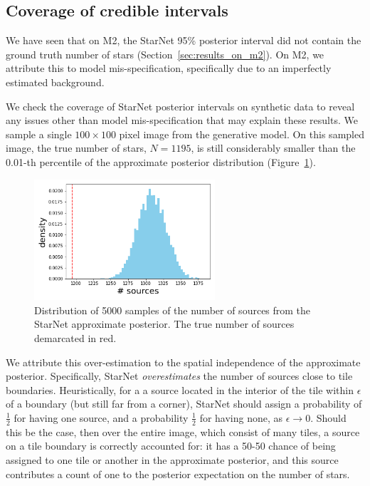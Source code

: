 \subsection{Coverage of credible intervals}

We have seen that on M2, the StarNet 95\% posterior interval did not contain the ground truth number of stars (Section~\ref{sec:results_on_m2}).
On M2, we attribute this to model mis-specification, specifically due to an imperfectly
estimated background.

We check the coverage of StarNet posterior intervals on synthetic data
to reveal any issues other than model mis-specification that may explain these results.
We sample a single $100\times100$ pixel image from the generative model. 
On this sampled image, the true number of stars, $N = 1195$,
is still considerably smaller than the 0.01-th percentile of
the approximate posterior distribution (Figure~\ref{fig:starnet_density}).


\begin{figure}[tb]
    \centering
    \includegraphics[width=0.6\textwidth]{./figures/coverage/starnet_histogram.png}
    \vspace{-0.4cm}
    \caption{Distribution of 5000 samples of the number of sources from the StarNet approximate posterior.
    The true number of sources demarcated in red. }
    \label{fig:starnet_density}
\end{figure}

We attribute this over-estimation to the spatial independence of the approximate posterior.
Specifically, StarNet \textit{overestimates} the number of sources close to tile boundaries.
Heuristically, for a
a source located in the interior of the tile
within $\epsilon$ of a boundary (but still far from a corner),
StarNet should assign a probability of $\frac{1}{2}$ for
having one source, and a probability $\frac{1}{2}$ for having none, as $\epsilon \rightarrow 0$.
Should this be the case, then over the entire image, which consist of many tiles,
a source on a tile boundary is correctly accounted for: it has a 50-50 chance of being assigned to one tile or another
in the approximate posterior, and this source contributes 
a count of one to the posterior expectation on the number of stars. 


